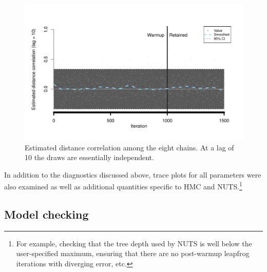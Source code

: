 \begin{figure}[h]
\centering
	\includegraphics[scale=0.75]{sections/figs/ck_dependence}
\caption{Estimated distance correlation among the eight chains. At a lag of 10 the draws are essentially independent. }
\label{fig:ck_dependence}
\end{figure}


In addition to the diagnostics discussed above, trace plots for all parameters were also examined as well as additional quantities specific to HMC and NUTS.\footnote{For example, checking that the tree depth used by NUTS is well below the user-specified maximum, ensuring that there are no post-warmup leapfrog iterations with diverging error, etc.}




\subsection{Model checking}
\label{subsection_model_checking}


